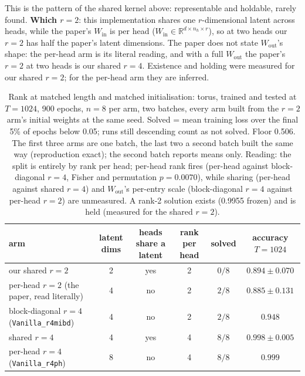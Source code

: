 \documentclass[10pt]{article}
\newcommand{\R}{\mathbb{R}}
\newcommand{\arm}[1]{\texttt{#1}}
\begin{document}
This is the pattern of the shared kernel above: representable and holdable, rarely found. \textbf{Which
$r=2$}: this implementation shares one $r$-dimensional latent across heads, while the paper's $W_{\mathrm{in}}$ is
per head ($W_{\mathrm{in}}\in\R^{d\times n_h\times r}$), so at two heads our $r=2$ has half the paper's
latent dimensions. The paper does not state $W_{\mathrm{out}}$'s shape: the per-head arm is its literal
reading, and with a full $W_{\mathrm{out}}$ the paper's $r=2$ at two heads is our shared $r=4$. Existence and
holding were measured for our shared $r=2$; for the per-head arm they are inferred.

\begin{table}[t]
\centering
\small
\captionsetup{font=footnotesize,skip=4pt}
\caption{Rank at matched length and matched initialisation: torus, trained and tested at $T=1024$, 900 epochs, $n=8$ per arm, two batches, every arm built from the $r=2$ arm's initial weights at the same seed. Solved = mean training loss over the final 5\% of epochs below 0.05; runs still descending count as not solved. Floor 0.506. The first three arms are one batch, the last two a second batch built the same way (reproduction exact); the second batch reports means only. Reading: the split is entirely by rank per head; per-head rank fires (per-head against block-diagonal $r=4$, Fisher and permutation $p=0.0070$), while sharing (per-head against shared $r=4$) and $W_{\mathrm{out}}$'s per-entry scale (block-diagonal $r=4$ against per-head $r=2$) are unmeasured. A rank-2 solution exists (0.9955 frozen) and is held (measured for the shared $r=2$).}
\label{tab:rank-mi}
\begin{tabular}{@{}lccccc@{}}
\toprule
arm & latent dims & heads share a latent & rank per head & solved & accuracy $T=1024$ \\
\midrule
our shared $r=2$ & 2 & yes & 2 & $0/8$ & $0.894\pm0.070$ \\
per-head $r=2$ (the paper, read literally) & 4 & no & 2 & $2/8$ & $0.885\pm0.131$ \\
block-diagonal $r=4$ (\arm{Vanilla\_r4mibd}) & 4 & no & 2 & $2/8$ & $0.948$ \\
shared $r=4$ & 4 & yes & 4 & $8/8$ & $0.998\pm0.005$ \\
per-head $r=4$ (\arm{Vanilla\_r4ph}) & 8 & no & 4 & $8/8$ & $0.999$ \\
\bottomrule
\end{tabular}
\end{table}
\end{document}
